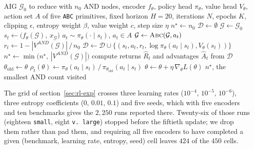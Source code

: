 \documentclass{article}
\begin{document}
\begin{algorithm}[h]
\caption{\textsc{GraphPPO}. The encoder $f_\theta$ is the only component that varies across the runs we compare; everything else is held fixed.}
\label{alg:graphppo}
\begin{algorithmic}[1]
\Require AIG $\mathcal{G}_0$ to reduce with $n_0$ AND nodes, encoder $f_\theta$, policy head $\pi_\theta$, value head $V_\theta$, action set $A$ of five \texttt{ABC} primitives, fixed horizon $H=20$, iterations $N$, epochs $K$, clipping $\epsilon$, entropy weight $\beta$, value weight $c$, step size $\eta$
\State $n^\star \gets n_0$
  \State $\mathcal{D} \gets \emptyset$
    \State $\mathcal{G} \gets \mathcal{G}_0$
      \State $s_t \gets \big(f_\theta(\mathcal{G}),\ x_\mathcal{G}\big)$ \label{line:encode} 
      \State $a_t \sim \pi_\theta(\cdot \mid s_t)$, \quad $a_t \in A$
      \State $\mathcal{G} \gets \textsc{Abc}(\mathcal{G}, a_t)$ 
      \State $r_t \gets 1 - |V^{AND}(\mathcal{G})| \,/\, n_0$ 
      \State $\mathcal{D} \gets \mathcal{D} \cup \{(s_t, a_t, r_t, \log\pi_\theta(a_t\mid s_t), V_\theta(s_t))\}$
      \State $n^\star \gets \min\big(n^\star,\ |V^{AND}(\mathcal{G})|\big)$
    \EndFor
  \EndFor
  \State compute returns $\hat R_t$ and advantages $\hat A_t$ from $\mathcal{D}$
  \State $\theta_{\text{old}} \gets \theta$
    \State $\rho_t(\theta) \gets \pi_\theta(a_t\mid s_t)\,/\,\pi_{\theta_{\text{old}}}(a_t\mid s_t)$
    \State $\theta \gets \theta + \eta\,\nabla_\theta L(\theta)$ 
  \EndFor
\EndFor
\State \Return $n^\star$, the smallest AND count visited
\end{algorithmic}
\end{algorithm}

The grid of section~\ref{sec:rl-exp} crosses three learning rates ($10^{-4}$, $10^{-5}$, $10^{-6}$), three entropy coefficients ($0$, $0.01$, $0.1$) and five seeds, which with five encoders and ten benchmarks gives the $2{,}250$ runs reported there.
Twenty-six of those runs (eighteen \texttt{small}, eight \texttt{v.\,large}) stopped before the fiftieth update; we drop them rather than pad them, and requiring all five encoders to have completed a given (benchmark, learning rate, entropy, seed) cell leaves $424$ of the $450$ cells.
\end{document}
